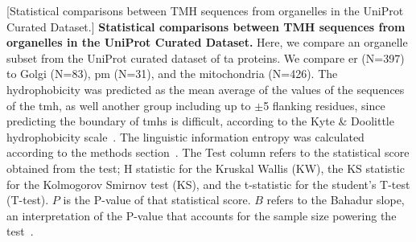 \begin{table}[htbp]
\centering
{}[Statistical comparisons between TMH sequences from organelles in the UniProt Curated Dataset.]
{\textbf{Statistical comparisons between TMH sequences from organelles in the UniProt Curated Dataset.}
Here, we compare an organelle subset from the UniProt curated dataset of \gls{ta} proteins.
We compare \gls{er} (N=397) to Golgi (N=83), \gls{pm} (N=31), and the mitochondria (N=426).
The hydrophobicity was predicted as the mean average of the values of the sequences of the \gls{tmh}, as well another group including up to $\pm$5 flanking residues, since predicting the boundary of \gls{tmh}s is difficult, according to the Kyte \& Doolittle hydrophobicity scale~\cite{Kyte1982}.
The linguistic information entropy was calculated according to the methods section~\cite{Shannon1948}.
The Test column refers to the statistical score obtained from the test; H statistic for the Kruskal Wallis (KW), the KS statistic for the Kolmogorov Smirnov test (KS), and the t-statistic for the student's T-test (T-test).
$P$ is the P\--value of that statistical score.
$B$ refers to the Bahadur slope, an interpretation of the P\--value that accounts for the sample size powering the test~\cite{Bahadur1967, Bahadur1971}.}
    \tiny


\end{table}

